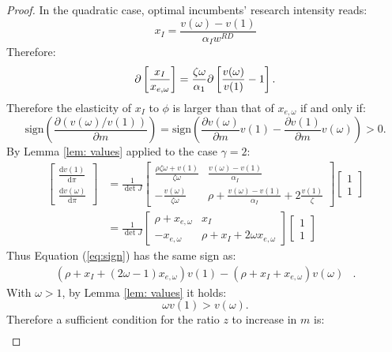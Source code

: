 \begin{proof}
In the quadratic case, optimal incumbents' research intensity reads:
\[
x_{I}=\frac{v(\omega)-v(1)}{\alpha_{I}w^{RD}}
\]
Therefore:
\[
\partial\left[\frac{x_{I}}{x_{e,\omega}}\right]=\frac{\zeta\omega}{\text{\ensuremath{\alpha_{1}}}}\partial\left[\frac{v(\omega)}{v(1)}-1\right].
\]
Therefore the elasticity of $x_{I}$ to $\phi$ is larger than that
of $x_{e,\omega}$ if and only if:
\begin{equation}
\text{sign}\left(\frac{\partial\left(v(\omega)/v(1)\right)}{\partial m}\right)=\text{sign}\left(\frac{\partial v(\omega)}{\partial m}v(1)-\frac{\partial v(1)}{\partial m}v(\omega)\right)>0.\label{eq:sign}
\end{equation}
By Lemma \ref{lem: values} applied to the case $\gamma=2$:
\begin{align*}
\left[\begin{matrix}\frac{\mathrm{d}v(1)}{\mathrm{d}\pi}\\
\frac{\mathrm{d}v(\omega)}{\mathrm{d}\pi}
\end{matrix}\right] & =\frac{1}{\det J}\left[\begin{matrix}\frac{\rho\zeta\omega+v(1)}{\zeta\omega} & \frac{v(\omega)-v(1)}{\alpha_{I}}\\
-\frac{v(\omega)}{\zeta\omega} & \rho+\frac{v(\omega)-v(1)}{\alpha_{I}}+2\frac{v(1)}{\zeta}
\end{matrix}\right]\left[\begin{matrix}1\\
1
\end{matrix}\right]\\
 & =\frac{1}{\det J}\left[\begin{matrix}\rho+x_{e,\omega} & x_{I}\\
-x_{e,\omega} & \rho+x_{I}+2\omega x_{e,\omega}
\end{matrix}\right]\left[\begin{matrix}1\\
1
\end{matrix}\right]
\end{align*}
 Thus Equation (\ref{eq:sign}) has the same sign as:
\begin{align*}
\left(\rho+x_{I}+\left(2\omega-1\right)x_{e,\omega}\right)v(1)-\left(\rho+x_{I}+x_{e,\omega}\right)v(\omega) & .
\end{align*}
With $\omega>1$, by Lemma \ref{lem: values} it holds:
\[
\omega v(1)>v(\omega).
\]
Therefore a sufficient condition for the ratio $z$ to increase in
$m$ is:
\begin{align*}

\end{align*}
\end{proof}
